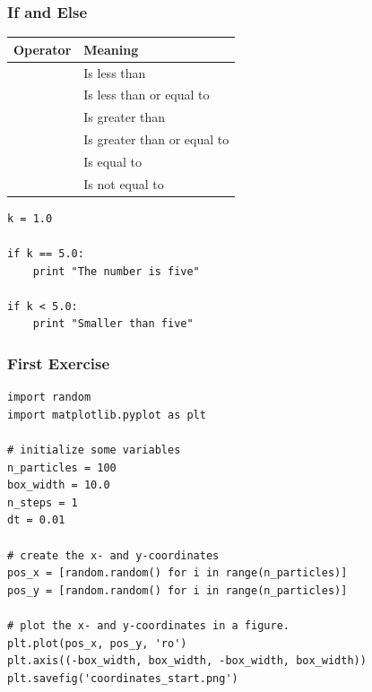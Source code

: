 \begin{frame}[fragile]

    \frametitle{If and Else}

    \centering

    \begin{tabular}{l l}

        \bf Operator & \bf Meaning \\

        \midrule

        \code{<}  & Is less than \\
        \code{<=} & Is less than or equal to \\
        \code{>}  & Is greater than \\
        \code{>=} & Is greater than or equal to \\
        \code{==} & Is equal to \\
        \code{!=} & Is not equal to\\

    \end{tabular}

    \bigskip

\begin{lstlisting}
k = 1.0

if k == 5.0:
    print "The number is five"

if k < 5.0:
    print "Smaller than five"

\end{lstlisting}


\end{frame}






\begin{frame}[fragile]

    \frametitle{First Exercise}

\begin{lstlisting}
import random
import matplotlib.pyplot as plt

# initialize some variables
n_particles = 100
box_width = 10.0
n_steps = 1
dt = 0.01

# create the x- and y-coordinates
pos_x = [random.random() for i in range(n_particles)]
pos_y = [random.random() for i in range(n_particles)]

# plot the x- and y-coordinates in a figure.
plt.plot(pos_x, pos_y, 'ro')
plt.axis((-box_width, box_width, -box_width, box_width))
plt.savefig('coordinates_start.png')

\end{lstlisting}


\end{frame}




